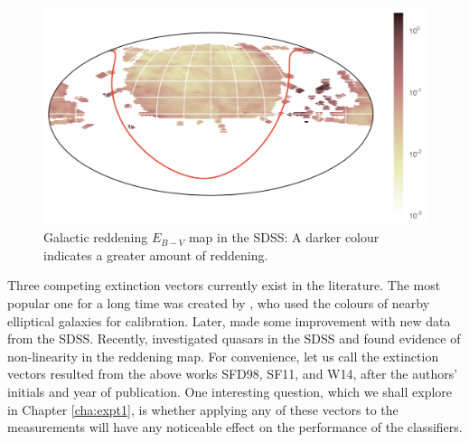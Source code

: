 \begin{figure}[tbp]
	\centering
	\includegraphics[width=\textwidth]{figures/2_astro/ebv_map}
	\caption[Galactic reddening map in the SDSS]{Galactic reddening $E_{B-V}$ map in the SDSS:
		A darker colour indicates a greater amount of reddening.}
	\label{fig:reddening}
\end{figure}

Three competing extinction vectors currently exist in the literature. The most popular one for a
long time was created by , who used the colours of nearby elliptical galaxies for
calibration. Later,  made some improvement with new data from the SDSS. Recently,
 investigated quasars in the SDSS and found evidence of non-linearity in the
reddening map. For convenience, let us call the extinction vectors resulted from the above works
SFD98, SF11, and W14, after the authors' initials and year of publication. One interesting
question, which we shall explore in Chapter \ref{cha:expt1}, is whether applying any of these
vectors to the measurements will have any noticeable effect on the performance of the classifiers.



